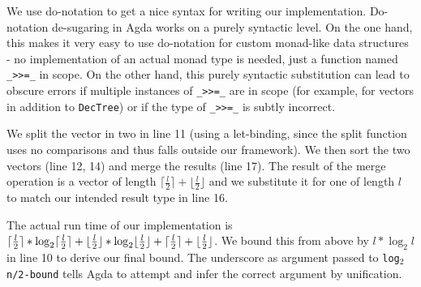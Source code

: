 We use do-notation to get a nice syntax for writing our implementation. Do-notation de-sugaring in Agda works on a purely syntactic level. On the one hand, this makes it very easy to use do-notation for custom monad-like data structures - no implementation of an actual monad type is needed, just a function named \texttt{\_>\/>=\_} in scope. On the other hand, this purely syntactic substitution can lead to obscure errors if multiple instances of \texttt{\_>\/>=\_} are in scope (for example, for vectors in addition to \texttt{DecTree}) or if the type of \texttt{\_>\/>=\_} is subtly incorrect.

We split the vector in two in line 11 (using a let-binding, since the split function uses no comparisons and thus falls outside our framework). We then sort the two vectors (line 12, 14) and merge the results (line 17). The result of the merge operation is a vector of length $\lceil \frac l 2 \rceil + \lfloor \frac l 2 \rfloor$ and we substitute it for one of length $l$ to match our intended result type in line 16.

The actual run time of our implementation is $\lceil \frac{l}{2} \rceil * \log_2 \lceil \frac{l}{2} \rceil + \lfloor \frac{l}{2} \rfloor * \log_2 \lfloor \frac{l}{2} \rfloor + \lceil \frac{l}{2} \rceil + \lfloor \frac{l}{2} \rfloor$. We bound this from above by $l * \log_2 l$ in line 10 to derive our final bound. The underscore as argument passed to \texttt{log$_2$n/2-bound} tells Agda to attempt and infer the correct argument by unification.
